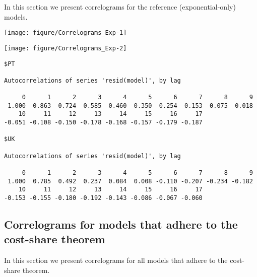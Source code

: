 \documentclass[preprint,authoryear,12pt]{elsarticle}\usepackage[]{graphicx}\usepackage[]{color}
\makeatletter
\def\maxwidth{ %
  \ifdim\Gin@nat@width>\linewidth
    \linewidth
  \else
    \Gin@nat@width
  \fi
}
\newenvironment{kframe}{%
 \def\at@end@of@kframe{}%
 \ifinner\ifhmode%
  \def\at@end@of@kframe{\end{minipage}}%
  \begin{minipage}{\columnwidth}%
 \fi\fi%
 \def\FrameCommand##1{\hskip\@totalleftmargin \hskip-\fboxsep
 \colorbox{shadecolor}{##1}\hskip-\fboxsep
     \hskip-\linewidth \hskip-\@totalleftmargin \hskip\columnwidth}%
 \MakeFramed {\advance\hsize-\width
   \@totalleftmargin\z@ \linewidth\hsize
   \@setminipage}}%
 {\par\unskip\endMakeFramed%
 \at@end@of@kframe}
\newenvironment{knitrout}{}{} %
\makeatother
\begin{document}
In this section we present correlograms for the reference (exponential-only) models. 

\begin{knitrout}
\color{fgcolor}
\texttt{[image: figure/Correlograms\_Exp-1]} 

\texttt{[image: figure/Correlograms\_Exp-2]} 
\begin{kframe}\begin{verbatim}
$PT

Autocorrelations of series 'resid(model)', by lag

     0      1      2      3      4      5      6      7      8      9 
 1.000  0.863  0.724  0.585  0.460  0.350  0.254  0.153  0.075  0.018 
    10     11     12     13     14     15     16     17 
-0.051 -0.108 -0.150 -0.178 -0.168 -0.157 -0.179 -0.187 

$UK

Autocorrelations of series 'resid(model)', by lag

     0      1      2      3      4      5      6      7      8      9 
 1.000  0.785  0.492  0.237  0.084  0.008 -0.110 -0.207 -0.234 -0.182 
    10     11     12     13     14     15     16     17 
-0.153 -0.155 -0.180 -0.192 -0.143 -0.086 -0.067 -0.060 
\end{verbatim}
\end{kframe}
\end{knitrout}


\subsection{Correlograms for models that adhere to the cost-share theorem} 
\label{sec:correlograms_CST}

In this section we present correlograms for all models that adhere to the cost-share theorem.
\end{document}
